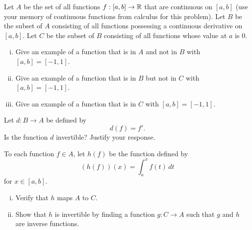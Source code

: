 \item Let $A$ be the set of all functions $f:[a,b] \to \mathbb{R}$ that are continuous on $[a,b]$ (use your memory of continuous functions from calculus for this problem). Let $B$ be the subset of $A$ consisting of all functions possessing a continuous derivative on $[a,b]$. Let $C$ be the subset of $B$ consisting of all functions whose value at $a$ is 0. 
\ba
\item 
	\begin{enumerate}[i.]
	\item Give an example of a function that is in $A$ and not in $B$ with $[a,b] = [-1,1]$. 
	\item Give an example of a function that is in $B$ but not in $C$ with $[a,b] = [-1,1]$. 
	\item Give an example of a function that is in $C$ with $[a,b] = [-1,1]$.
	\end{enumerate}
 
\item Let $d:B \to A$ be defined by 
\[d(f) = f'.\]
Is the function $d$ invertible? Justify your response.

\item To each function $f \in A$, let $h(f)$ be the function defined by 
\[(h(f))(x) = \int_a^x f(t) \, dt\]
for $x \in [a,b]$.
	\begin{enumerate}[i.]
	\item Verify that $h$ maps $A$ to $C$. 
	
	\item Show that $h$ is invertible by finding a function $g : C \to A$ such that $g$ and $h$ are inverse functions. 
	\end{enumerate}

\ea

